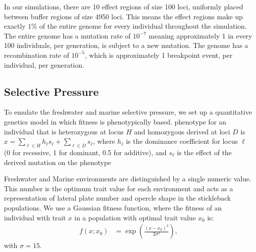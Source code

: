 \documentclass{article}
\begin{document}
In our simulations, there are 10 effect regions of size 100 loci, uniformly placed between buffer regions of size 4950 loci. 
This means the effect regions make up exactly $1\%$ of the entire genome for every individual throughout the simulation. 
The entire genome has a mutation rate of $10^{-7}$ meaning approximately 1 in every 100 individuals, per generation, is subject to a new mutation. 
The genome has a recombination rate of $10^{-5}$, which is approximately 1 breakpoint event, per individual, per generation. 

\subsection*{Selective Pressure}



To emulate the freshwater and marine selective pressure, 
we set up a quantitative genetics model in which fitness is phenotypically based. 
phenotype for an individual that is heterozygous at locus $H$
and homozygous derived at loci $D$ is $x = \sum_{\ell \in H} h_\ell s_\ell + \sum_{\ell \in D} s_\ell$,
where $h_\ell$ is the dominance coefficient for locus $\ell$ (0 for recessive, 1 for dominant, 0.5 for additive),
and $s_\ell$ is the effect of the derived mutation on the phenotype

Freshwater and Marine environments are distinguished by a single numeric value. 
This number is the optimum trait value for each environment
and acts as a representation of lateral plate number and opercle shape in the stickleback populations.
We use a Gaussian fitness function, 
where the fitness of an individual with trait $x$ in a population with optimal trait value $x_0$ is:
\begin{align}
    f(x; x_0) &= \exp\left(\frac{(x - x_0)^2 }{ 2 \sigma^2}\right),
\end{align}
with $\sigma = 15$.

\end{document}
